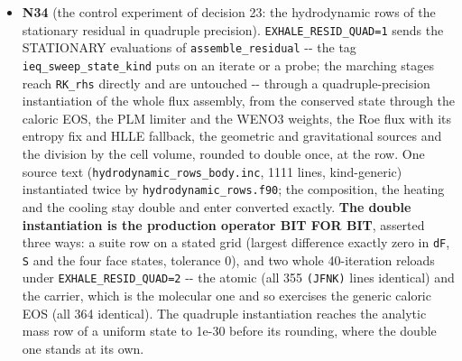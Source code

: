 \documentclass[english,a4paper]{my_memo}
\begin{document}
\begin{itemize}
  out of scope. Advisor: rebuild on \texttt{build\_lwv}; \texttt{krylov\_and\_dogleg} 220/0, \texttt{steady\_species\_rows} 194/0; atomic reload at cap 40 with every hook off, 8 threads: the N31 ladder to the digit (7.607e-2 at 40, handed back 5.377e-2, spread 3.555e-3), no \texttt{{[}diag\ 14{]}} line; two British spellings in the new comments fixed. Accepted; deliverable 2 correctly not built (there is no branch to smooth). The finding is structural and reaches the marching discretization, so it is put to the user as DECISION 23 (well-balanced flux differencing recommended; quad accumulation of the flux difference as the control experiment; coarser base cells; accept the floor). The \texttt{count} global shadowing the intrinsic recorded in ISSUES 3.7 (HYG). \textbf{Next item N34} (runs without a decision, changes no default): the control experiment, quad accumulation of the face fluxes and their difference inside the stationary residual only, as a measured option.
\item
  \textbf{N34} (the control experiment of decision 23: the hydrodynamic rows of
  the stationary residual in quadruple precision). \texttt{EXHALE\_RESID\_QUAD=1}
  sends the STATIONARY evaluations of \texttt{assemble\_residual} -\/- the tag
  \texttt{ieq\_sweep\_state\_kind} puts on an iterate or a probe; the marching
  stages reach \texttt{RK\_rhs} directly and are untouched -\/- through a
  quadruple-precision instantiation of the whole flux assembly, from the
  conserved state through the caloric EOS, the PLM limiter and the WENO3
  weights, the Roe flux with its entropy fix and HLLE fallback, the
  geometric and gravitational sources and the division by the cell volume,
  rounded to double once, at the row. One source text
  (\texttt{hydrodynamic\_rows\_body.inc}, 1111 lines, kind-generic) instantiated
  twice by \texttt{hydrodynamic\_rows.f90}; the composition, the heating and the
  cooling stay double and enter converted exactly. \textbf{The double
  instantiation is the production operator BIT FOR BIT}, asserted three
  ways: a suite row on a stated grid (largest difference exactly zero in
  \texttt{dF}, \texttt{S} and the four face states, tolerance 0), and two whole
  40-iteration reloads under \texttt{EXHALE\_RESID\_QUAD=2} -\/- the atomic (all 355
  \texttt{(JFNK)} lines identical) and the carrier, which is the molecular one
  and so exercises the generic caloric EOS (all 364 identical). The
  quadruple instantiation reaches the analytic mass row of a uniform state
  to 1e-30 before its rounding, where the double one stands at its own.

\end{itemize}
\end{document}
